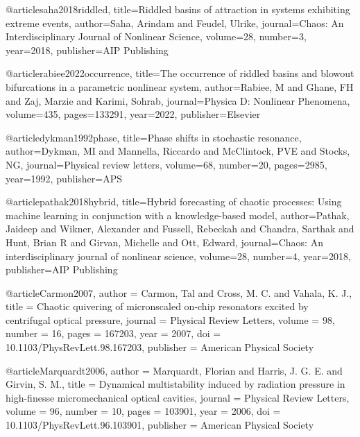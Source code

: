 @article{saha2018riddled,
title={Riddled basins of attraction in systems exhibiting extreme events}, author={Saha, Arindam and Feudel, Ulrike},
journal={Chaos: An Interdisciplinary Journal of Nonlinear Science}, 
volume={28},
number={3}, 
year={2018}, 
publisher={AIP Publishing}
} 








@article{rabiee2022occurrence,
  title={The occurrence of riddled basins and blowout bifurcations in a parametric nonlinear system},
  author={Rabiee, M and Ghane, FH and Zaj, Marzie and Karimi, Sohrab},
  journal={Physica D: Nonlinear Phenomena},
  volume={435},
  pages={133291},
  year={2022},
  publisher={Elsevier}
}



@article{dykman1992phase,
  title={Phase shifts in stochastic resonance},
  author={Dykman, MI and Mannella, Riccardo and McClintock, PVE and Stocks, NG},
  journal={Physical review letters},
  volume={68},
  number={20},
  pages={2985},
  year={1992},
  publisher={APS}
}



@article{pathak2018hybrid,
  title={Hybrid forecasting of chaotic processes: Using machine learning in conjunction with a knowledge-based model},
  author={Pathak, Jaideep and Wikner, Alexander and Fussell, Rebeckah and Chandra, Sarthak and Hunt, Brian R and Girvan, Michelle and Ott, Edward},
  journal={Chaos: An interdisciplinary journal of nonlinear science},
  volume={28},
  number={4},
  year={2018},
  publisher={AIP Publishing}
}

@article{Carmon2007,
  author = {Carmon, Tal and Cross, M. C. and Vahala, K. J.},
  title = {Chaotic quivering of micronscaled on-chip resonators excited by centrifugal optical pressure},
  journal = {Physical Review Letters},
  volume = {98},
  number = {16},
  pages = {167203},
  year = {2007},
  doi = {10.1103/PhysRevLett.98.167203},
  publisher = {American Physical Society}
}

@article{Marquardt2006,
  author = {Marquardt, Florian and Harris, J. G. E. and Girvin, S. M.},
  title = {Dynamical multistability induced by radiation pressure in high-finesse micromechanical optical cavities},
  journal = {Physical Review Letters},
  volume = {96},
  number = {10},
  pages = {103901},
  year = {2006},
  doi = {10.1103/PhysRevLett.96.103901},
  publisher = {American Physical Society}
}






